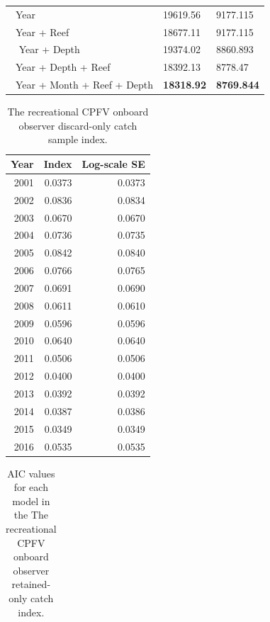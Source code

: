 \documentclass[12pt,]{article}
\begin{document}
\begin{table}[ht]
\begin{tabular}{lll}
  \hline
~Year & 19619.56 & 9177.115 \\ 
  ~Year + Reef & 18677.11 & 9177.115 \\ 
  ~ Year + Depth & 19374.02 & 8860.893 \\ 
  ~Year + Depth + Reef & 18392.13 & 8778.47 \\ 
  ~Year + Month + Reef + Depth & \textbf{18318.92} & \textbf{8769.844} \\ 
   \hline
\end{tabular}
\end{table}\begin{table}[ht]
\centering
\caption{The recreational CPFV
                                            onboard observer discard-only
                                            catch sample index.} 
\label{tab:Fleet6_RecDD_onboard_index}
\begin{tabular}{rrr}
  \hline
Year & Index & Log-scale SE \\ 
  \hline
 2001 & 0.0373 & 0.0373 \\ 
   2002 & 0.0836 & 0.0834 \\ 
   2003 & 0.0670 & 0.0670 \\ 
   2004 & 0.0736 & 0.0735 \\ 
   2005 & 0.0842 & 0.0840 \\ 
   2006 & 0.0766 & 0.0765 \\ 
   2007 & 0.0691 & 0.0690 \\ 
   2008 & 0.0611 & 0.0610 \\ 
   2009 & 0.0596 & 0.0596 \\ 
   2010 & 0.0640 & 0.0640 \\ 
   2011 & 0.0506 & 0.0506 \\ 
   2012 & 0.0400 & 0.0400 \\ 
   2013 & 0.0392 & 0.0392 \\ 
   2014 & 0.0387 & 0.0386 \\ 
   2015 & 0.0349 & 0.0349 \\ 
   2016 & 0.0535 & 0.0535 \\ 
   \hline
\end{tabular}
\end{table}\begin{table}[ht]
\centering
\caption{AIC values for each model in the
                                          The recreational CPFV onboard 
                                          observer retained-only catch 
                                          index.} 
\label{tab:Fleet12_RecPC_onboard_aic}
\begin{tabular}{lll}

\end{tabular}
\end{table}
\end{document}
